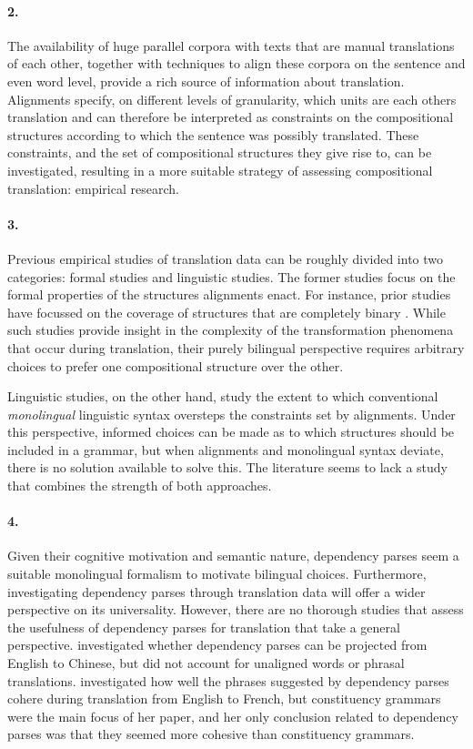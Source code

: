 \paragraph{2.} The availability of huge parallel corpora with texts that are manual translations of each other, together with techniques to align these corpora on the sentence and even word level, provide a rich source of information about translation. Alignments specify, on different levels of granularity, which units are each others translation and can therefore be interpreted as constraints on the compositional structures according to which the sentence was possibly translated. These constraints, and the set of compositional structures they give rise to, can be investigated, resulting in a more suitable strategy of assessing compositional translation: empirical research.

\paragraph{3.} Previous empirical studies of translation data can be roughly divided into two categories: formal studies and linguistic studies. The former studies focus on the formal properties of the structures alignments enact. For instance, prior studies have focussed on the coverage of structures that are completely binary \citep[e.g.,][]{sogaard2009empirical1}. While such studies provide insight in the complexity of the transformation phenomena that occur during translation, their purely bilingual perspective requires arbitrary choices to prefer one compositional structure over the other.

Linguistic studies, on the other hand, study the extent to which conventional \textit{monolingual} linguistic syntax oversteps the constraints set by alignments\citep[e.g.,][]{fox2002phrasal,hwa2002evaluating}. Under this perspective, informed choices can be made as to which structures should be included in a grammar, but when alignments and monolingual syntax deviate, there is no solution available to solve this. The literature seems to lack a study that combines the strength of both approaches.

\paragraph{4.} Given their cognitive motivation and semantic nature, dependency parses seem a suitable monolingual formalism to motivate bilingual choices. Furthermore, investigating dependency parses through translation data will offer a wider perspective on its universality. However, there are no thorough studies that assess the usefulness of dependency parses for translation that take a general perspective. \cite{hwa2002evaluating} investigated whether dependency parses can be projected from English to Chinese, but did not account for unaligned words or phrasal translations. \cite{fox2002phrasal} investigated how well the phrases suggested by dependency parses cohere during translation from English to French, but constituency grammars were the main focus of her paper, and her only conclusion related to dependency parses was that they seemed more cohesive than constituency grammars.

